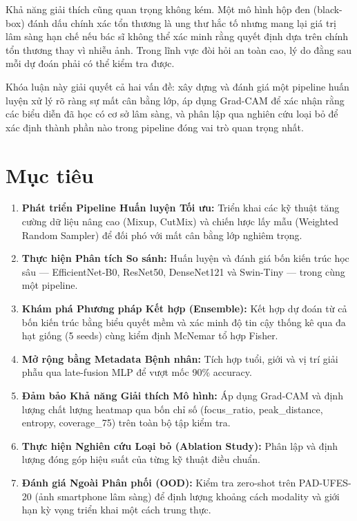 \documentclass[11pt,a4paper]{report}
\begin{document}
Khả năng giải thích cũng quan trọng không kém. Một mô hình hộp đen (black-box) đánh dấu chính xác tổn thương là ung thư hắc tố nhưng mang lại giá trị lâm sàng hạn chế nếu bác sĩ không thể xác minh rằng quyết định dựa trên chính tổn thương thay vì nhiễu ảnh. Trong lĩnh vực đòi hỏi an toàn cao, lý do đằng sau mỗi dự đoán phải có thể kiểm tra được.

Khóa luận này giải quyết cả hai vấn đề: xây dựng và đánh giá một pipeline huấn luyện xử lý rõ ràng sự mất cân bằng lớp, áp dụng Grad-CAM để xác nhận rằng các biểu diễn đã học có cơ sở lâm sàng, và phân lập qua nghiên cứu loại bỏ để xác định thành phần nào trong pipeline đóng vai trò quan trọng nhất.

\section{Mục tiêu}

\begin{enumerate}
    \item \textbf{Phát triển Pipeline Huấn luyện Tối ưu:} Triển khai các kỹ thuật tăng cường dữ liệu nâng cao (Mixup, CutMix) và chiến lược lấy mẫu (Weighted Random Sampler) để đối phó với mất cân bằng lớp nghiêm trọng.
    \item \textbf{Thực hiện Phân tích So sánh:} Huấn luyện và đánh giá bốn kiến trúc học sâu --- EfficientNet-B0, ResNet50, DenseNet121 và Swin-Tiny --- trong cùng một pipeline.
    \item \textbf{Khám phá Phương pháp Kết hợp (Ensemble):} Kết hợp dự đoán từ cả bốn kiến trúc bằng biểu quyết mềm và xác minh độ tin cậy thống kê qua đa hạt giống (5 seeds) cùng kiểm định McNemar tổ hợp Fisher.
    \item \textbf{Mở rộng bằng Metadata Bệnh nhân:} Tích hợp tuổi, giới và vị trí giải phẫu qua late-fusion MLP để vượt mốc 90\% accuracy.
    \item \textbf{Đảm bảo Khả năng Giải thích Mô hình:} Áp dụng Grad-CAM và định lượng chất lượng heatmap qua bốn chỉ số (focus\_ratio, peak\_distance, entropy, coverage\_75) trên toàn bộ tập kiểm tra.
    \item \textbf{Thực hiện Nghiên cứu Loại bỏ (Ablation Study):} Phân lập và định lượng đóng góp hiệu suất của từng kỹ thuật điều chuẩn.
    \item \textbf{Đánh giá Ngoài Phân phối (OOD):} Kiểm tra zero-shot trên PAD-UFES-20 (ảnh smartphone lâm sàng) để định lượng khoảng cách modality và giới hạn kỳ vọng triển khai một cách trung thực.
\end{enumerate}
\end{document}
